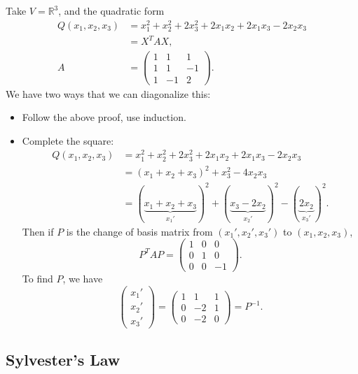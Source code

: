 \documentclass[12pt]{article}
\begin{document}
\begin{exbox}
	Take $V = \mathbb{R}^3$, and the quadratic form
	 \begin{align*}
		 Q(x_1, x_2, x_3) &= x_1^2 + x_2^2 + 2x_3^2 + 2x_1 x_2 + 2x_1 x_3 - 2x_2 x_3 \\
				  &= X^{T}AX, \\
		 A &=
		 \begin{pmatrix}
			 1 & 1 & 1 \\
			 1 & 1 & -1 \\
			 1 & -1 & 2
		 \end{pmatrix}.
	\end{align*}
	We have two ways that we can diagonalize this:
	\begin{itemize}
		\item Follow the above proof, use induction.
		\item Complete the square:
			\begin{align*}
				Q(x_1, x_2, x_3) &= x_1^2 + x_2^2 + 2x_3^2 + 2x_1x_2 + 2x_1x_3 - 2x_2 x_3 \\
						 &= (x_1 + x_2 + x_3)^2 + x_3^2 - 4x_2 x_3 \\
						 &= (\underbrace{x_1 + x_2 + x_3}_{x_1'})^2 + (\underbrace{x_3 - 2x_2}_{x_2'})^2 - (\underbrace{2x_2}_{x_3'})^2.
			\end{align*}
			Then if $P$ is the change of basis matrix from $(x_1', x_2', x_3')$ to $(x_1, x_2, x_3)$,
			\[
			P^{T}AP =
			\begin{pmatrix}
				1 & 0 & 0 \\
				0 & 1 & 0 \\
				0 & 0 & -1
			\end{pmatrix}
			.\]
			To find $P$, we have
			\[
				\begin{pmatrix}
					x_1' \\
					x_2' \\
					x_3'
				\end{pmatrix}
				=
				\begin{pmatrix}
					1 & 1 & 1 \\
					0 & -2 & 1 \\
					0 & -2 & 0
				\end{pmatrix}
				= P^{-1}
			.\]
	\end{itemize}
\end{exbox}

\subsection{Sylvester's Law}
\label{sub:sylvesters_law}
\end{document}
